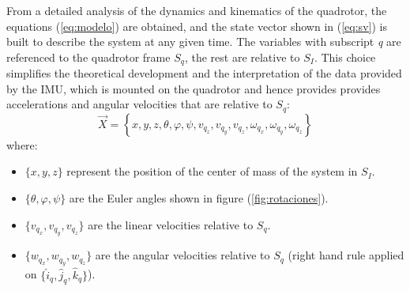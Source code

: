 \documentclass[conference]{IEEEtran}
\newcommand{\refp}[1]{(\ref{#1})}
\begin{document}
From a detailed analysis of the dynamics and kinematics of the quadrotor, the equations \refp{eq:modelo} are obtained, and the state vector shown in \refp{eq:sv} is built to describe the system at any given time. The variables with subscript \textit{q} are referenced to the quadrotor frame $S_q$, the rest are relative to $S_I$. This choice simplifies the theoretical development and the interpretation of the data provided by the IMU, which is mounted on the quadrotor and hence provides provides accelerations and angular velocities that are relative to $S_q$:
\begin{equation}
\vec{X}=\left\lbrace  x,y,z, \theta,\varphi,\psi, v_{q_z},v_{q_y},v_{q_z},\omega_{q_x},\omega_{q_y},\omega_{q_z} \right\rbrace
\label{eq:sv}
\end{equation}
where:
\begin{itemize}
\item $\lbrace x,y,z \rbrace$ represent the position of the center of mass of the system in $S_I$.
\item $\lbrace\theta,\varphi,\psi\rbrace$ are the Euler angles shown in figure \refp{fig:rotaciones}.
\item $\lbrace v_{q_x},v_{q_y},v_{q_z}\rbrace$ are the linear velocities relative to $S_q$.
\item $\lbrace w_{q_x},w_{q_y},w_{q_z}\rbrace$ are the angular velocities relative to $S_q$ (right hand rule applied on $\lbrace \hat{i}_q,\hat{j}_q,\hat{k}_q\rbrace$).
\end{itemize}
\end{document}
